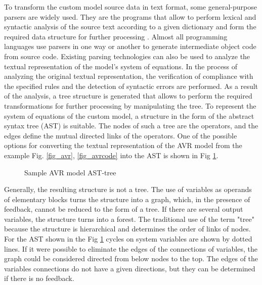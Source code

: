 \documentclass[lettersize,journal]{IEEEtran}
\begin{document}
To transform the custom model source data in text format, some general-purpose parsers are widely used. They are the programs
that allow to perform lexical and syntactic analysis of the source text according to a given dictionary and form the required 
data structure for further processing \cite{texbook}. Almost all programming languages use parsers in one way or another to generate 
intermediate object code from source code. Existing parsing technologies can also be used to analyze the textual representation 
of the model's system of equations. In the process of analyzing the original textual representation, the verification of compliance 
with the specified rules and the detection of syntactic errors are performed. As a result of the analysis, a tree structure is
generated that allows to perform the required transformations for further processing by manipulating the tree. To represent the system of equations 
of the custom model, a structure in the form of the abstract syntax tree (AST) is suitable. The nodes of such a tree are the
operators, and the edges define the mutual directed links of the operators. One of the possible options for converting the textual
representation of the AVR model from the example Fig. \ref{fig_avr}, \ref{fig_avrcode} into the AST is shown in Fig \ref{fig_ast}.

\begin{figure}[h]
	\centering
	\caption{Sample AVR model AST-tree }
	\label{fig_ast}
\end{figure}

Generally, the resulting structure is not a tree. The use of variables as operands of elementary blocks turns the structure into a graph,
which, in the presence of feedback, cannot be reduced to the form of a tree. If there are several output variables, the structure
turns into a forest. The traditional use of the term "tree" because the structure is hierarchical and determines
the order of links of nodes. For the AST shown in the Fig \ref{fig_ast} cycles on system variables are shown by dotted lines. 
If it were possible to eliminate the edges of the connections of variables, the graph could be considered directed from below
nodes to the top. The edges of the variables connections do not have a given directions, but they can be determined 
if there is no feedback.

\end{document}
